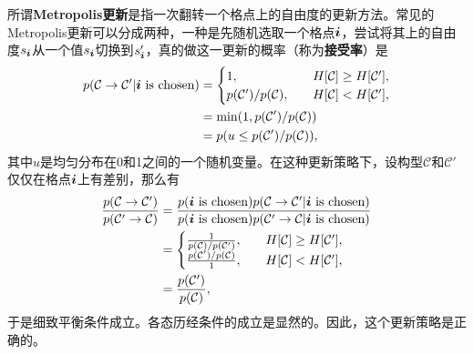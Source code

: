 \documentclass[UTF8]{ctexart}
\newcommand*{\concept}[1]{{\textbf{#1}}}
\begin{document}
所谓\concept{Metropolis更新}是指一次翻转一个格点上的自由度的更新方法。常见的Metropolis更新可以分成两种，一种是先随机选取一个格点$\vb*{i}$，尝试将其上的自由度$s_{\vb*{i}}$从一个值$s_{\vb*{i}}$切换到$s_{\vb*{i}}'$，真的做这一更新的概率（称为\concept{接受率}）是
\begin{equation}
    \begin{aligned}
        p(\mathcal{C} \to \mathcal{C}' | \text{$\vb*{i}$ is chosen}) &= \begin{cases}
            1, &\quad H[\mathcal{C}] \geq H[\mathcal{C}'], \\
            {p(\mathcal{C}')} / {p(\mathcal{C})}, &\quad H[\mathcal{C}] < H[\mathcal{C}'],
        \end{cases} \\
        &= \min (1, p(\mathcal{C}') / p(\mathcal{C})) \\
        &= p(u \leq p(\mathcal{C}') / p(\mathcal{C}) ),
    \end{aligned}
    \label{eq:metropolis-update}
\end{equation}
其中$u$是均匀分布在0和1之间的一个随机变量。在这种更新策略下，设构型$\mathcal{C}$和$\mathcal{C}'$仅仅在格点$\vb*{i}$上有差别，那么有
\begin{equation}
    \begin{aligned}
        \frac{p(\mathcal{C} \to \mathcal{C}')}{p(\mathcal{C}' \to \mathcal{C})} &= \frac{p(\text{$\vb*{i}$ is chosen}) p(\mathcal{C} \to \mathcal{C}' | \text{$\vb*{i}$ is chosen})}{p(\text{$\vb*{i}$ is chosen}) p(\mathcal{C}' \to \mathcal{C} | \text{$\vb*{i}$ is chosen})} \\
        &= \begin{cases}
            \frac{1}{p(\mathcal{C}) / p(\mathcal{C}')} , &\quad H[\mathcal{C}] \geq H[\mathcal{C}'], \\
            \frac{p(\mathcal{C}') / p(\mathcal{C})}{1}, &\quad H[\mathcal{C}] < H[\mathcal{C}'], 
        \end{cases} \\
        &= \frac{p(\mathcal{C}')}{p(\mathcal{C})},
    \end{aligned}
\end{equation}
于是细致平衡条件成立。各态历经条件的成立是显然的。因此，这个更新策略是正确的。
\end{document}
